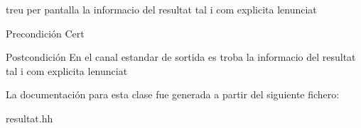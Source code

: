 treu per pantalla la informacio del resultat tal i com explicita l\textquotesingle{}enunciat 

\begin{DoxyPrecond}{Precondición}
Cert 
\end{DoxyPrecond}
\begin{DoxyPostcond}{Postcondición}
En el canal estandar de sortida es troba la informacio del resultat tal i com explicita l\textquotesingle{}enunciat 
\end{DoxyPostcond}


La documentación para esta clase fue generada a partir del siguiente fichero\+:\begin{DoxyCompactItemize}
\item 
resultat.\+hh\end{DoxyCompactItemize}
